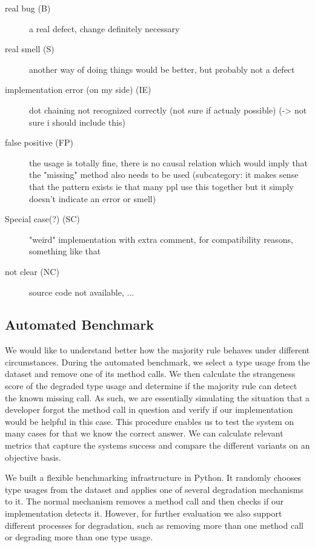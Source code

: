 \begin{description}
    \item [real bug (B)] a real defect, change definitely necessary
    \item [real smell (S)] another way of doing things would be better, but probably not a defect
    \item [implementation error (on my side) (IE)] dot chaining not recognized correctly (not sure if actualy possible) (-> not sure i should include this)
    \item [false positive (FP)] the usage is totally fine, there is no causal relation which would imply that the "missing" method also needs to be used
	(subcategory: it makes sense that the pattern exists ie that many ppl use this together but it simply doesn't indicate an error or smell)
    \item [Special case(?) (SC)] "weird" implementation with extra comment, for compatibility reasons, something like that
    \item [not clear (NC)] source code not available, ...
\end{description}

\subsection{Automated Benchmark}

We would like to understand better how the majority rule behaves under different circumstances.
During the automated benchmark, we select a type usage from the dataset and remove one of its method calls.
We then calculate the strangeness score of the degraded type usage and determine if the majority rule can detect the known missing call.
As such, we are essentially simulating the situation that a developer forgot the method call in question and verify if our implementation would be helpful in this case.
This procedure enables us to test the system on many cases for that we know the correct answer.
We can calculate relevant metrics that capture the systems success and compare the different variants on an objective basis.

We built a flexible benchmarking infrastructure in Python.
It randomly chooses type usages from the dataset and applies one of several degradation mechanisms to it.
The normal mechanism removes a method call and then checks if our implementation detects it.
However, for further evaluation we also support different processes for degradation, such as removing more than one method call or degrading more than one type usage.

